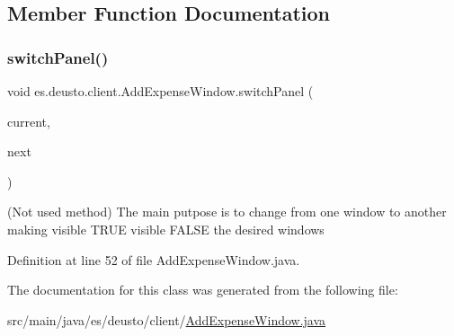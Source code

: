 \subsection{Member Function Documentation}
\mbox{\label{classes_1_1deusto_1_1client_1_1_add_expense_window_a6240f4fbc81e74662e2b811e20768e9a}} 
\subsubsection{\texorpdfstring{switch\+Panel()}{switchPanel()}}
{\footnotesize\ttfamily void es.\+deusto.\+client.\+Add\+Expense\+Window.\+switch\+Panel (\begin{DoxyParamCaption}\item[{J\+Panel}]{current,  }\item[{J\+Panel}]{next }\end{DoxyParamCaption})}

(Not used method) The main putpose is to change from one window to another making visible T\+R\+UE visible F\+A\+L\+SE the desired windows 

Definition at line 52 of file Add\+Expense\+Window.\+java.



The documentation for this class was generated from the following file\+:\begin{DoxyCompactItemize}
\item 
src/main/java/es/deusto/client/\hyperlink{_add_expense_window_8java}{Add\+Expense\+Window.\+java}\end{DoxyCompactItemize}
